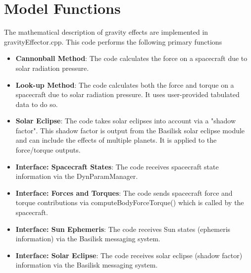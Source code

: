 \section{Model Functions}
The mathematical description of gravity effects are implemented in gravityEffector.cpp. This code performs the following primary functions
\begin{itemize}
	\item \textbf{Cannonball Method}: The code calculates the force on a spacecraft due to solar radiation pressure.
	\item \textbf{Look-up Method}: The code calculates both the force and torque on a spacecraft due to solar radiation pressure. It uses user-provided tabulated data to do so.
	\item \textbf{Solar Eclipse}: The code takes solar eclipses into account via a "shadow factor". This shadow factor is output from the Basilisk solar eclipse module and can include the effects of multiple planets. It is applied to the force/torque outputs.
	\item \textbf{Interface: Spacecraft States}: The code receives spacecraft state information via the DynParamManager.
	\item \textbf{Interface: Forces and Torques}: The code sends spacecraft force and torque contributions via computeBodyForceTorque() which is called by the spacecraft.	
	\item \textbf{Interface: Sun Ephemeris}: The code receives Sun states (ephemeris information) via the Basilisk messaging system.
	\item \textbf{Interface: Solar Eclipse}: The code receives solar eclipse (shadow factor) information via the Basilisk messaging system.
	
\end{itemize}